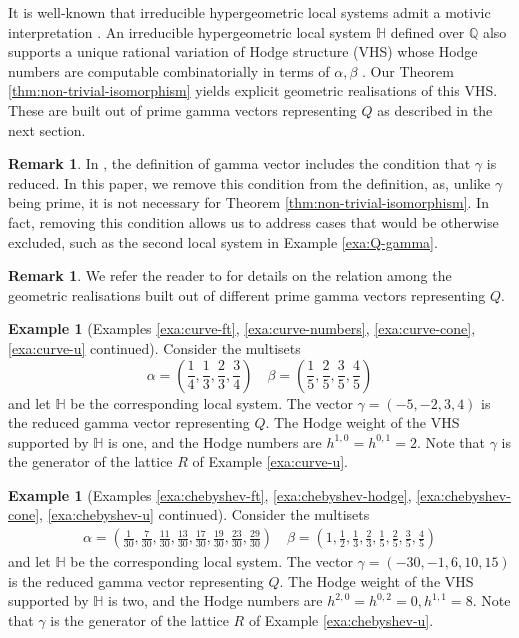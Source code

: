 \documentclass[11pt, reqno]{amsart}
\theoremstyle{plain}
\theoremstyle{definition}
\newtheorem{rem}[thm]{Remark}
\newtheorem{example}[thm]{Example}
\newcommand{\QQ}{\mathbb{Q}}
\newcommand{\HH}{\mathbb{H}}
\begin{document}
It is well-known that irreducible 
hypergeometric local systems admit a motivic interpretation \cite{Andre-G-functions, Katz}. An irreducible hypergeometric local system $\HH$ defined over $\QQ$ also supports a unique rational variation of Hodge structure (VHS) whose Hodge numbers are computable combinatorially in terms of $\alpha, \beta$ \cite{AG, Fedorov}. 
Our Theorem \ref{thm:non-trivial-isomorphism} yields explicit geometric realisations of this VHS. These are built out of prime gamma vectors representing $Q$ as described in the next section. 


\begin{rem} 
In \cite{RV}, the definition of gamma vector includes the condition that $\gamma$ is reduced. 
In this paper, we remove this condition from the definition, as, unlike $\gamma$ being prime, it is not necessary for Theorem \ref{thm:non-trivial-isomorphism}. In fact, removing this condition allows us to address cases that would be otherwise excluded, such as the second local system in Example \ref{exa:Q-gamma}.  
\end{rem}

\begin{rem}
    We refer the reader to \cite[\S 1.3]{GGFRV} for details on the relation among the geometric realisations built out of different prime gamma vectors representing $Q$. 
\end{rem}


\begin{example}[Examples \ref{exa:curve-ft}, \ref{exa:curve-numbers}, \ref{exa:curve-cone}, \ref{exa:curve-u} continued]
\label{exa:curve-gamma}
Consider the multisets \[\alpha=\left(\frac{1}{4},\frac{1}{3}, \frac{2}{3}, \frac{3}{4}\right) \quad \beta=\left(\frac{1}{5}, \frac{2}{5}, \frac{3}{5},\frac{4}{5}\right)\]
and let $\HH$ be the corresponding local system. The vector $\gamma=(-5,-2,3,4)$ is the reduced gamma vector representing $Q$. The Hodge weight of the VHS supported by $\HH$ is one, and the Hodge numbers are $h^{1,0}=h^{0,1}=2$. 
Note that $\gamma$ is the generator of the lattice $R$ of Example \ref{exa:curve-u}.
\end{example}

\begin{example}[Examples \ref{exa:chebyshev-ft}, \ref{exa:chebyshev-hodge}, \ref{exa:chebyshev-cone}, \ref{exa:chebyshev-u} continued]
\label{exa:chebyshev-gamma}
Consider the multisets
\begin{align*}
  \alpha = \left(\frac{1}{30}, \frac{7}{30}, \frac{11}{30}, \frac{13}{30}, \frac{17}{30}, \frac{19}{30}, \frac{23}{30}, \frac{29}{30}\right) \quad 
  \beta  = \left(1,\frac{1}{2}, \frac{1}{3}, \frac{2}{3}, \frac{1}{5}, \frac{2}{5}, \frac{3}{5}, \frac{4}{5}\right)  
\end{align*}
and let $\HH$ be the corresponding local system. The vector $\gamma=(-30,-1,6,10,15)$ is the reduced gamma vector representing $Q$. The Hodge weight of the VHS supported by $\HH$ is two, and the Hodge numbers are $h^{2,0}=h^{0,2}=0, h^{1,1}=8$. Note that $\gamma$ is the generator of the lattice $R$ of Example \ref{exa:chebyshev-u}.
\end{example}
\end{document}
